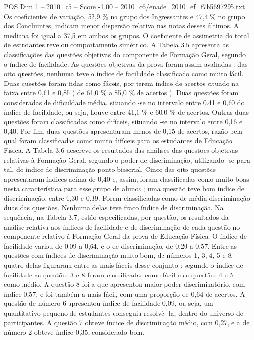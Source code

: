 \begin{textsample}{POS Dim 1 – 2010\_c6 – Score -1.00 – 2010\_c6/enade\_2010\_ef\_f7b5697295.txt}
Os coeficientes de variação, 52,9 \% no grupo dos Ingressantes e 47,4 \% no grupo dos Concluintes, indicam menor dispersão relativa nas notas desses últimos.
A mediana foi igual a 37,5 em ambos os grupos.
O coeficiente de assimetria do total de estudantes revelou comportamento simétrico.
A Tabela 3.5 apresenta as classificações das questões objetivas do componente de Formação Geral, segundo o índice de facilidade.
As questões objetivas da prova foram assim avaliadas : das oito questões, nenhuma teve o índice de facilidade classificado como muito fácil.
Duas questões foram tidas como fáceis, por terem índice de acertos situado na faixa entre 0,61 e 0,85 ( de 61,0 \% a 85,0 \% de acertos ).
Duas questões foram consideradas de dificuldade média, situando -se no intervalo entre 0,41 e 0,60 do índice de facilidade, ou seja, houve entre 41,0 \% e 60,0 \% de acertos.
Outras duas questões foram classificadas como difíceis, situando -se no intervalo entre 0,16 e 0,40.
Por fim, duas questões apresentaram menos de 0,15 de acertos, razão pela qual foram classificadas como muito difíceis para os estudantes de Educação Física.
A Tabela 3.6 descreve os resultados das análises das questões objetivas relativas à Formação Geral, segundo o poder de discriminação, utilizando -se para tal, do índice de discriminação ponto bisserial.
Cinco das oito questões apresentaram índices acima de 0,40 e, assim, foram classificadas como muito boas nesta característica para esse grupo de alunos ; uma questão teve bom índice de discriminação, entre 0,30 e 0,39.
Foram classificadas como de média discriminação duas das questões.
Nenhuma delas teve fraco índice de discriminação.
Na sequência, na Tabela 3.7, estão especificadas, por questão, os resultados da análise relativa aos índices de facilidade e de discriminação de cada questão no componente relativo à Formação Geral da prova de Educação Física.
O índice de facilidade variou de 0,09 a 0,64, e o de discriminação, de 0,20 a 0,57.
Entre as questões com índices de discriminação muito bom, de números 1, 3, 4, 5 e 8, quatro delas figuraram entre as mais fáceis desse conjunto : segundo o índice de facilidade as questões 3 e 8 foram classificadas como fácil e as questões 4 e 5 como médio.
A questão 8 foi a que apresentou maior poder discriminatório, com índice 0,57, e foi também a mais fácil, com uma proporção de 0,64 de acertos.
A questão de número 6 apresentou índice de facilidade 0,09, ou seja, um quantitativo pequeno de estudantes conseguiu resolvê -la, dentro do universo de participantes.
A questão 7 obteve índice de discriminação médio, com 0,27, e a de número 2 obteve índice 0,35, considerado bom.

\end{textsample}
